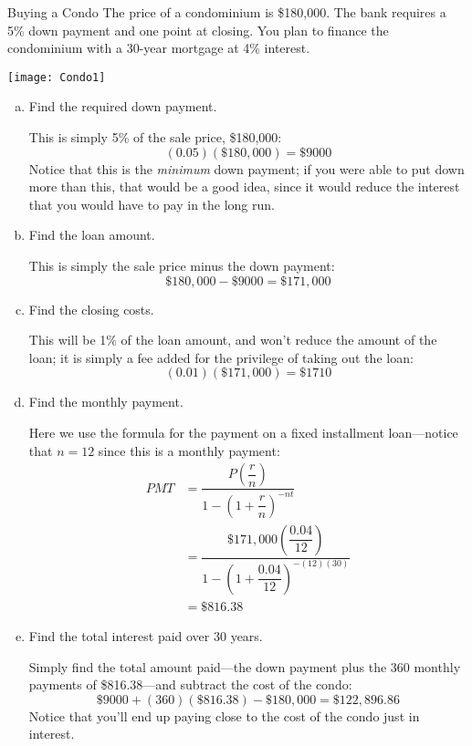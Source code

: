 \begin{example}[https://www.youtube.com/watch?v=lcCuSQxX--Y]{Buying a Condo}
The price of a condominium is \$180,000.  The bank requires a 5\% down payment and one point at closing.  You plan to finance the condominium with a 30-year mortgage at 4\% interest.\\

\begin{center}\texttt{[image: Condo1]}\end{center}
\vfill
\pagebreak
\begin{enumerate}[(a)]
\item Find the required down payment.

This is simply 5\% of the sale price, \$180,000:
\[(0.05)(\$180,000) = \$9000\]
Notice that this is the \textit{minimum} down payment; if you were able to put down more than this, that would be a good idea, since it would reduce the interest that you would have to pay in the long run.
\pagebreak

\item Find the loan amount.

This is simply the sale price minus the down payment:
\[\$180,000 - \$9000 = \$171,000\]

\item Find the closing costs.

This will be 1\% of the loan amount, and won't reduce the amount of the loan; it is simply a fee added for the privilege of taking out the loan:
\[(0.01)(\$171,000) = \$1710\]

\item Find the monthly payment.

Here we use the formula for the payment on a fixed installment loan---notice that $n=12$ since this is a monthly payment:
\begin{align*}
PMT &= \dfrac{P\left(\dfrac{r}{n}\right)}{1-\left(1+\dfrac{r}{n}\right)^{-nt}}\\
&= \dfrac{\$171,000\left(\dfrac{0.04}{12}\right)}{1-\left(1+\dfrac{0.04}{12}\right)^{-(12)(30)}}\\
&= \$816.38
\end{align*}

\item Find the total interest paid over 30 years.

Simply find the total amount paid---the down payment plus the 360 monthly payments of \$816.38---and subtract the cost of the condo:
\[\$9000+(360)(\$816.38)-\$180,000 = \$122,896.86\]
Notice that you'll end up paying close to the cost of the condo just in interest.
\end{enumerate}
\end{example}

